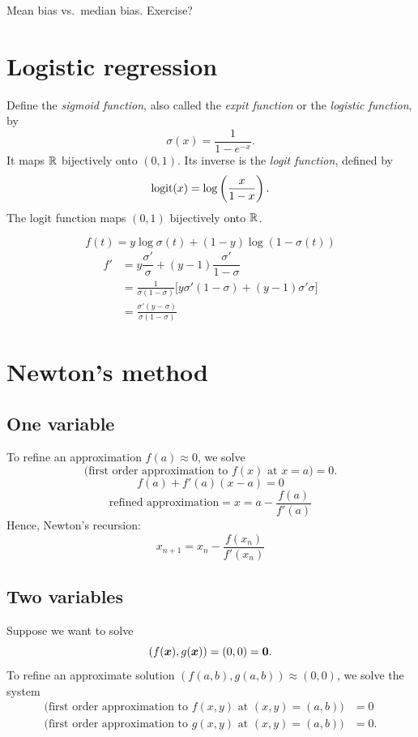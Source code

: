 \documentclass[12pt]{amsart}
\begin{document}
Mean bias vs.\ median bias. Exercise?

\section{Logistic regression}
Define the \emph{sigmoid function}, also called the \emph{expit function} or the \emph{logistic function}, by
\[
    \sigma(x) = \frac1{1-e^{-x}}.
\]
It maps $\mathbb{R}$ bijectively onto $(0,1)$. Its inverse is the \emph{logit function}, defined by
\[
    \operatorname{logit}(x) = \log\left(\dfrac x{1-x}\right).
\]
The logit function maps $(0,1)$ bijectively onto $\mathbb{R}$.

\[
    f(t) = y\log\sigma(t) + (1-y)\log(1-\sigma(t))
\]
\begin{align*}
    f' &= y\dfrac{\sigma'}{\sigma} + (y-1)\dfrac{\sigma'}{1-\sigma}\\
    & = \frac1{\sigma(1-\sigma)}\big[y\sigma'(1-\sigma) + (y-1)\sigma'\sigma\big]\\
    & =  \frac{\sigma'(y - \sigma)}{\sigma(1-\sigma)}
\end{align*}

\section{Newton's method}
\subsection{One variable}
To refine an approximation $f(a)\approx 0$, we solve
\[
    \big(\text{first order approximation to $f(x)$ at $x=a$}\big) = 0.
\]
\[
    f(a) + f'(a)(x-a)=0
\]
\[
    \text{refined approximation} = x = a - \frac{f(a)}{f'(a)}
\]
Hence, Newton's recursion:
\[
    x_{n+1} = x_n - \frac{f(x_n)}{f'(x_n)}
\]

\subsection{Two variables}
Suppose we want to solve
\[
    (f(\boldsymbol{x}), g(\boldsymbol{x}))=(0,0)=\boldsymbol{0}.
\]
To refine an approximate solution $(f(a,b), g(a,b))\approx (0,0)$, we solve the system
\begin{align*}
    \big(\text{first order approximation to $f(x, y)$ at $(x,y)=(a,b)$}\big) &= 0\\
    \big(\text{first order approximation to $g(x, y)$ at $(x,y)=(a,b)$}\big) &= 0.
\end{align*}
    
\end{document}
